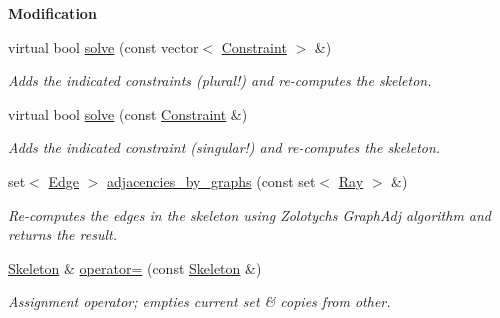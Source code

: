 \begin{Indent}\textbf{ Modification}\par
\begin{DoxyCompactItemize}
\item 
virtual bool \hyperlink{group___c_l_s_solvers_aba082a338a2cb3ace612fd2dfba667c5}{solve} (const vector$<$ \hyperlink{group___c_l_s_solvers_class_l_p___solvers_1_1_constraint}{Constraint} $>$ \&)
\begin{DoxyCompactList}\small\item\em Adds the indicated constraints (plural!) and re-\/computes the skeleton. \end{DoxyCompactList}\item 
virtual bool \hyperlink{group___c_l_s_solvers_a202b0b37e0ea8a817ce6e29c93a39cd8}{solve} (const \hyperlink{group___c_l_s_solvers_class_l_p___solvers_1_1_constraint}{Constraint} \&)
\begin{DoxyCompactList}\small\item\em Adds the indicated constraint (singular!) and re-\/computes the skeleton. \end{DoxyCompactList}\item 
\mbox{\label{group___c_l_s_solvers_a91e67ca8a8fc7a891534462c21051ea1}} 
set$<$ \hyperlink{group___c_l_s_solvers_class_l_p___solvers_1_1_edge}{Edge} $>$ \hyperlink{group___c_l_s_solvers_a91e67ca8a8fc7a891534462c21051ea1}{adjacencies\+\_\+by\+\_\+graphs} (const set$<$ \hyperlink{group___c_l_s_solvers_class_l_p___solvers_1_1_ray}{Ray} $>$ \&)
\begin{DoxyCompactList}\small\item\em Re-\/computes the edges in the skeleton using Zolotych\textquotesingle{}s {\ttfamily Graph\+Adj} algorithm and returns the result. \end{DoxyCompactList}\item 
\mbox{\label{group___c_l_s_solvers_a6ca243248975b2f1935169d78c44033b}} 
\hyperlink{group___c_l_s_solvers_class_l_p___solvers_1_1_skeleton}{Skeleton} \& \hyperlink{group___c_l_s_solvers_a6ca243248975b2f1935169d78c44033b}{operator=} (const \hyperlink{group___c_l_s_solvers_class_l_p___solvers_1_1_skeleton}{Skeleton} \&)
\begin{DoxyCompactList}\small\item\em Assignment operator; empties current set \& copies from other. \end{DoxyCompactList}\end{DoxyCompactItemize}
\end{Indent}
